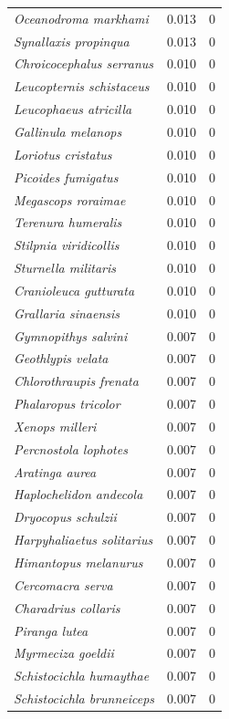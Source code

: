 \documentclass[12pt,a4paper]{article}
\begin{document}
\begin{longtable}{p{6.2cm}cr}
  \textit{Oceanodroma markhami} & 0.013 & 0 \\
  \textit{Synallaxis propinqua} & 0.013 & 0 \\
  \textit{Chroicocephalus serranus} & 0.010 & 0 \\
  \textit{Leucopternis schistaceus} & 0.010 & 0 \\
  \textit{Leucophaeus atricilla} & 0.010 & 0 \\
  \textit{Gallinula melanops} & 0.010 & 0 \\
  \textit{Loriotus cristatus} & 0.010 & 0 \\
  \textit{Picoides fumigatus} & 0.010 & 0 \\
  \textit{Megascops roraimae} & 0.010 & 0 \\
  \textit{Terenura humeralis} & 0.010 & 0 \\
  \textit{Stilpnia viridicollis} & 0.010 & 0 \\
  \textit{Sturnella militaris} & 0.010 & 0 \\
  \textit{Cranioleuca gutturata} & 0.010 & 0 \\
  \textit{Grallaria sinaensis} & 0.010 & 0 \\
  \textit{Gymnopithys salvini} & 0.007 & 0 \\
  \textit{Geothlypis velata} & 0.007 & 0 \\
  \textit{Chlorothraupis frenata} & 0.007 & 0 \\
  \textit{Phalaropus tricolor} & 0.007 & 0 \\
  \textit{Xenops milleri} & 0.007 & 0 \\
  \textit{Percnostola lophotes} & 0.007 & 0 \\
  \textit{Aratinga aurea} & 0.007 & 0 \\
  \textit{Haplochelidon andecola} & 0.007 & 0 \\
  \textit{Dryocopus schulzii} & 0.007 & 0 \\
  \textit{Harpyhaliaetus solitarius} & 0.007 & 0 \\
  \textit{Himantopus melanurus} & 0.007 & 0 \\
  \textit{Cercomacra serva} & 0.007 & 0 \\
  \textit{Charadrius collaris} & 0.007 & 0 \\
  \textit{Piranga lutea} & 0.007 & 0 \\
  \textit{Myrmeciza goeldii} & 0.007 & 0 \\
  \textit{Schistocichla humaythae} & 0.007 & 0 \\
  \textit{Schistocichla brunneiceps} & 0.007 & 0 \\

\end{longtable}
\end{document}
